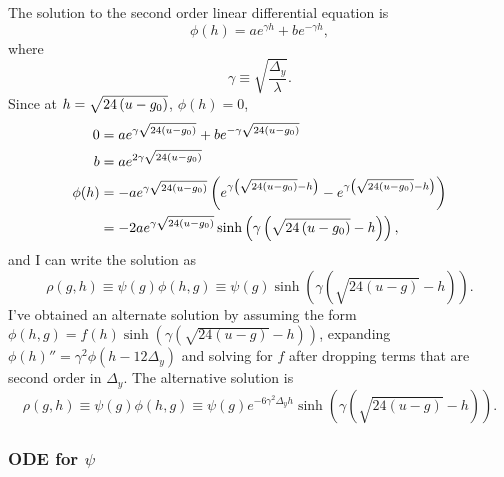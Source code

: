 \documentclass[]{article}
\begin{document}
The solution to the second order linear differential equation is
\begin{equation*}
  \phi(h) = a e^{\gamma h} + b e^{-\gamma h},
\end{equation*}
where
\begin{equation*}
  \gamma \equiv \sqrt{\frac{\Delta_y}{\lambda}}.
\end{equation*}
Since at $h = \sqrt{24\left(u-g_0\right)}$, $\phi(h) = 0$,
\begin{align*}
  0 &= a e^{\gamma \sqrt{24\left(u-g_0\right)}} + b e^{-\gamma \sqrt{24\left(u-g_0\right)}} \\
  b &= a e^{2\gamma \sqrt{24\left(u-g_0\right)}} \\
  \phi(h) &= -a e^{\gamma \sqrt{24\left(u-g_0\right)}} \left(
    e^{\gamma \left( \sqrt{24\left(u-g_0\right)} - h \right) } -
    e^{\gamma \left(\sqrt{24\left(u-g_0\right)} - h \right) } \right) \\
  &= -2 a e^{\gamma \sqrt{24\left(u-g_0\right)}} \sinh \left( \gamma \left( \sqrt{24\left(u-g_0\right)}
      - h \right) \right),
\end{align*}
and I can write the solution as
\newcommand{\phiHG}[2]{\sinh \left( \gamma \left( \sqrt{24(u-#2)} - #1
    \right) \right)}
\begin{equation}
  \label{eq:sol_h}
  \rho(g,h) \equiv \psi(g) \phi(h,g) \equiv \psi(g) \phiHG{h}{g}.
\end{equation}
\newcommand{\altphiHG}[2]{e^{-6\gamma^2 \Delta_y h} \sinh \left( \gamma
    \left( \sqrt{24(u-#2)} - #1 \right) \right)} I've obtained an
alternate solution by assuming the form $\phi(h,g) = f(h) \sinh\left(
  \gamma \left( \sqrt{24(u-g)} - h \right) \right)$, expanding
$\phi(h)'' = \gamma^2 \phi(h - 12\Delta_y)$ and solving for $f$ after
dropping terms that are second order in $\Delta_y$.  The alternative
solution is
\begin{equation}
  \label{eq:sol_h_}
  \rho(g,h) \equiv \psi(g) \phi(h,g) \equiv \psi(g) \altphiHG{h}{g}.  
\end{equation}

\subsubsection{ODE for $\psi$}
\label{sec:ODE}
\end{document}
